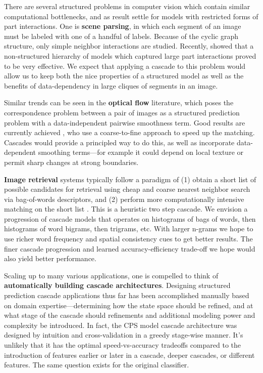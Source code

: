 There are several structured problems in computer vision which contain similar 
computational bottlenecks, and as result settle for models with restricted 
forms of part interactions.  One is \textbf{scene parsing}, in which each 
segment of an image must be labeled with one of a handful of labels.  Because 
of the cyclic graph structure, only simple neighbor interactions are studied.  
Recently, \citet{munoz10} showed that a non-structured hierarchy of models 
which captured large part interactions proved to be very effective.  We expect 
that applying a cascade to this problem would allow us to keep both the nice 
properties of a structured model as well as the benefits of data-dependency in 
large cliques of segments in an image.

Similar trends can be seen in the \textbf{optical flow} literature, which poses 
the correspondence problem between a pair of images as a structured prediction 
problem with a data-independent pairwise smoothness term.  Good results are 
currently achieved \citet{liu2011sift}, who use a coarse-to-fine approach to 
speed up the matching.  Cascades would provide a principled way to do this, as 
well as incorporate data-dependent smoothing terms---for example it could 
depend on local texture or permit sharp changes at strong boundaries.

\textbf{Image retrieval} systems typically follow a paradigm of (1) obtain a 
short list of possible candidates for retrieval using cheap and coarse nearest 
neighbor search via bag-of-words descriptors, and (2) perform more 
computationally intensive matching on the short list 
\citep{wang2011contextual}.  This is a heuristic two step cascade.  We envision 
a progression of cascade models that operates on histograms of bags of words, 
then histograms of word bigrams, then trigrams, etc. With larger n-grams we 
hope to use richer word frequency and spatial consistency cues to get better 
results.  The finer cascade progression and learned accuracy-efficiency 
trade-off we hope would also yield better performance.

Scaling up to many various applications, one is compelled to think of 
\textbf{automatically building cascade architectures}.  Designing structured 
prediction cascade applications thus far has been accomplished manually based 
on domain expertise---determining how the state space should be refined, and at 
what stage of the cascade should refinements and additional modeling power and 
complexity be introduced.  In fact, the CPS model cascade architecture was 
designed by intuition and cross-validation in a greedy stage-wise manner.  It's 
unlikely that it has the optimal speed-vs-accuracy tradeoffs compared to the 
introduction of features earlier or later in a cascade, deeper cascades,  or 
different features. The same question exists for the original \citet{viola02} 
classifier.

